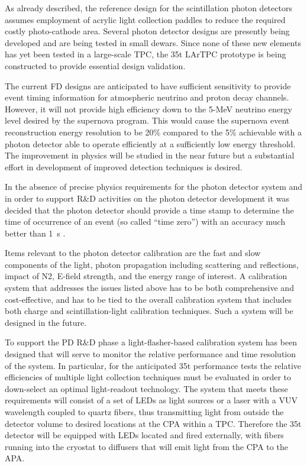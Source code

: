 As already described, the
reference design for the scintillation photon detectors assumes employment of
acrylic light collection paddles to reduce the required costly
photo-cathode area. Several photon detector designs are presently
being developed and are being tested in small dewars. Since %
none of
these new elements has %
yet been tested in a large-scale TPC, the
35t LArTPC prototype is being constructed to provide essential
design validation. 

The current FD designs are anticipated to have
sufficient sensitivity to provide event timing information for
atmospheric neutrino and proton decay channels. However, it will not
provide high efficiency down to the 5-MeV neutrino energy level
desired by the supernova program. %
This would cause the supernova event reconstruction energy resolution to be 20\% compared to the 5\%
achievable with %
a photon detector
able to operate efficiently at a sufficiently low energy
threshold. The improvement in physics will be studied in the near
future but a substantial effort in development of improved detection
techniques is desired. 

In the absence of precise physics requirements
for the photon detector system and in order to support R\&D activities
on the photon detector development it was decided that the photon
detector should provide a time stamp to determine the time of
occurrence of an event (so called ``time zero'') with an accuracy much
better than 1~s .  

Items relevant to the photon detector calibration
are the fast and slow components of the light, photon propagation
including scattering and reflections, impact of N2,  E-field strength,
and the energy range of interest. A calibration system that
addresses the issues listed above has to be both comprehensive and
cost-effective, and has to be tied to the overall calibration system
that includes both charge and scintillation-light calibration
techniques. Such a system will be designed in the future.  

To support
the PD R\&D phase a light-flasher-based calibration system
has been designed
that will serve to monitor the relative performance and time
resolution of the system. In particular, for the anticipated 35t
performance tests the relative efficiencies of
multiple light collection techniques must be evaluated in order to 
down-select an optimal light-readout technology. The system that meets
these requirements will consist of a set of LEDs as light sources or a
laser with a VUV wavelength coupled to quartz fibers, thus
transmitting light from outside the detector volume to desired
locations at the CPA within a TPC. Therefore the 35t
detector will be equipped with LEDs located and fired externally, with fibers running
into the cryostat to diffusers that will emit light from the CPA to
the APA. 


